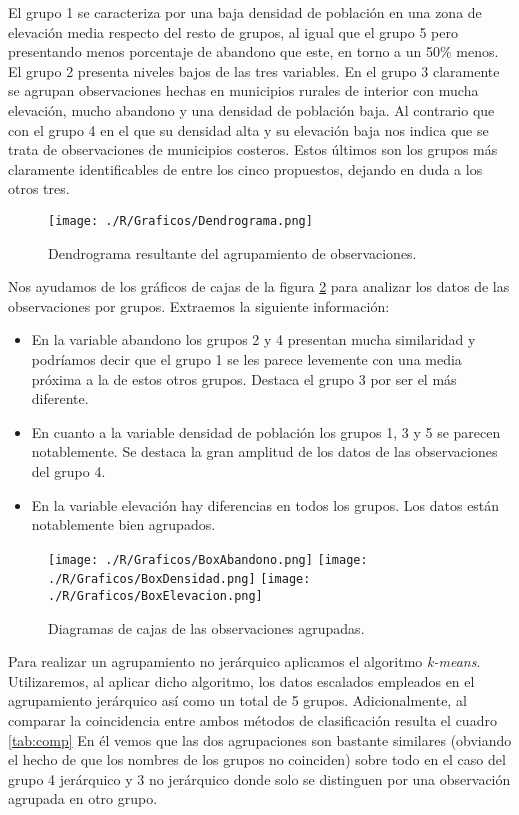 \documentclass[11pt,a4paper]{article}
\begin{document}
El grupo 1 se caracteriza por una baja densidad de población en una zona de elevación media respecto del resto de grupos, al igual que el grupo 5 pero presentando menos porcentaje de abandono que este, en torno a un 50\% menos. El grupo 2 presenta niveles bajos de las tres variables. En el grupo 3 claramente se agrupan observaciones hechas en municipios rurales de interior con mucha elevación, mucho abandono y una densidad de población baja. Al contrario que con el grupo 4 en el que su densidad alta y su elevación baja nos indica que se trata de observaciones de municipios costeros. Estos últimos son los grupos más claramente identificables de entre los cinco propuestos, dejando en duda a los otros tres.

\begin{figure}
\centering
\texttt{[image: ./R/Graficos/Dendrograma.png]}
\caption{Dendrograma resultante del agrupamiento de observaciones.}
\label{fig:dendro}
\end{figure}

Nos ayudamos de los gráficos de cajas de la figura \ref{fig:box} para analizar los datos de las observaciones por grupos. Extraemos la siguiente información:
\begin{itemize}
\item En la variable abandono los grupos 2 y 4 presentan mucha similaridad y podríamos decir que el grupo 1 se les parece levemente con una media próxima a la de estos otros grupos. Destaca el grupo 3 por ser el más diferente.
\item En cuanto a la variable densidad de población los grupos 1, 3 y 5 se parecen notablemente. Se destaca la gran amplitud de los datos de las observaciones del grupo 4.
\item En la variable elevación hay diferencias en todos los grupos. Los datos están notablemente bien agrupados.
\end{itemize}

\begin{figure}
\centering
\texttt{[image: ./R/Graficos/BoxAbandono.png]}
\texttt{[image: ./R/Graficos/BoxDensidad.png]}
\texttt{[image: ./R/Graficos/BoxElevacion.png]}
\caption{Diagramas de cajas de las observaciones agrupadas.}
\label{fig:box}
\end{figure}

Para realizar un agrupamiento no jerárquico aplicamos el algoritmo \textit{k-means}. Utilizaremos, al aplicar dicho algoritmo, los datos escalados empleados en el agrupamiento jerárquico así como un total de 5 grupos. Adicionalmente, al comparar la coincidencia entre ambos métodos de clasificación resulta el cuadro \ref{tab:comp} En él vemos que las dos agrupaciones son bastante similares (obviando el hecho de que los nombres de los grupos no coinciden) sobre todo en el caso del grupo 4 jerárquico y 3 no jerárquico donde solo se distinguen por una observación agrupada en otro grupo.
\end{document}
